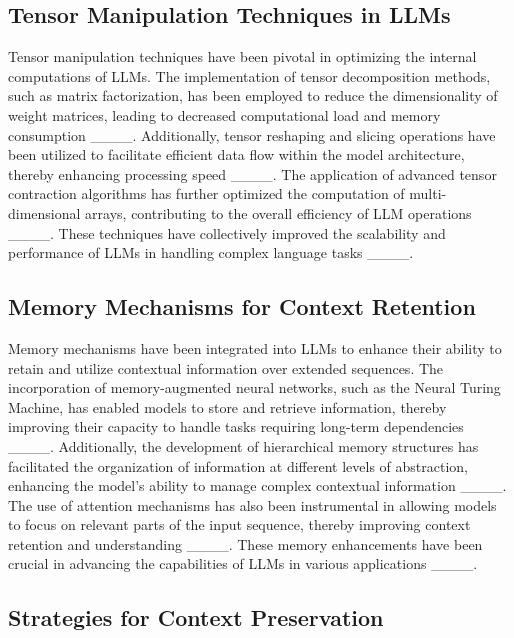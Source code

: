 \subsection{Tensor Manipulation Techniques in LLMs}

Tensor manipulation techniques have been pivotal in optimizing the internal computations of LLMs. The implementation of tensor decomposition methods, such as matrix factorization, has been employed to reduce the dimensionality of weight matrices, leading to decreased computational load and memory consumption ____. Additionally, tensor reshaping and slicing operations have been utilized to facilitate efficient data flow within the model architecture, thereby enhancing processing speed ____. The application of advanced tensor contraction algorithms has further optimized the computation of multi-dimensional arrays, contributing to the overall efficiency of LLM operations ____. These techniques have collectively improved the scalability and performance of LLMs in handling complex language tasks ____.

\subsection{Memory Mechanisms for Context Retention}

Memory mechanisms have been integrated into LLMs to enhance their ability to retain and utilize contextual information over extended sequences. The incorporation of memory-augmented neural networks, such as the Neural Turing Machine, has enabled models to store and retrieve information, thereby improving their capacity to handle tasks requiring long-term dependencies ____. Additionally, the development of hierarchical memory structures has facilitated the organization of information at different levels of abstraction, enhancing the model's ability to manage complex contextual information ____. The use of attention mechanisms has also been instrumental in allowing models to focus on relevant parts of the input sequence, thereby improving context retention and understanding ____. These memory enhancements have been crucial in advancing the capabilities of LLMs in various applications ____.

\subsection{Strategies for Context Preservation}

